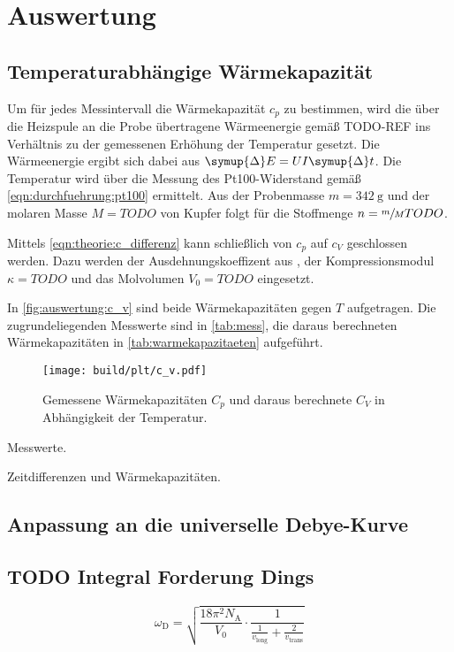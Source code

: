 \section{Auswertung}
\label{sec:auswertung}

\subsection{Temperaturabhängige Wärmekapazität}
Um für jedes Messintervall die Wärmekapazität $c_p$ zu bestimmen,
wird die über die Heizspule an die Probe übertragene Wärmeenergie
 gemäß TODO-REF
ins Verhältnis zu der gemessenen Erhöhung der Temperatur gesetzt.
Die Wärmeenergie ergibt sich dabei aus $\symup{\Delta}E = U I \symup{\Delta}t$.
Die Temperatur wird über die Messung des Pt100-Widerstand gemäß \autoref{eqn:durchfuehrung:pt100} ermittelt.
Aus der Probenmasse $m = \SI{342}{\gram}$ \cite{versuchsanleitung} und der molaren Masse $M = TODO$ von Kupfer
folgt für die Stoffmenge $n = \sfrac{m}{M} TODO$.

Mittels \autoref{eqn:theorie:c_differenz} kann schließlich von $c_p$ auf $c_V$ geschlossen werden.
Dazu werden
der Ausdehnungskoeffizent aus \cite[Tabelle 2]{versuchsanleitung},
der Kompressionsmodul $\kappa = TODO$ und
das Molvolumen $V_0 = TODO$ eingesetzt.

In \autoref{fig:auswertung:c_v} sind beide Wärmekapazitäten gegen $T$ aufgetragen.
Die zugrundeliegenden Messwerte sind in \autoref{tab:mess},
die daraus berechneten Wärmekapazitäten in \autoref{tab:warmekapazitaeten} aufgeführt.

\begin{figure}[H]
    \centering
    \texttt{[image: build/plt/c\_v.pdf]}
    \caption{Gemessene Wärmekapazitäten $C_p$ und daraus berechnete $C_V$ in Abhängigkeit der Temperatur.}
    \label{fig:auswertung:c_v}
\end{figure}

\begin{table}
    \centering
    \caption{Messwerte.}
    \label{tab:mess}
\end{table}

\begin{table}
    \centering
    \caption{Zeitdifferenzen und Wärmekapazitäten.}
    \label{tab:warmekapazitaeten}
\end{table}


\subsection{Anpassung an die universelle Debye-Kurve}


\subsection{TODO Integral Forderung Dings}
\begin{equation*}
    \omega_\text{D}
    = \sqrt{
        \frac{18 \pi^2 N_\text{A}}{V_0} · \frac{1}{\frac{1}{v_\text{long}} + \frac{2}{v_\text{trans}}}
    }
\end{equation*}
